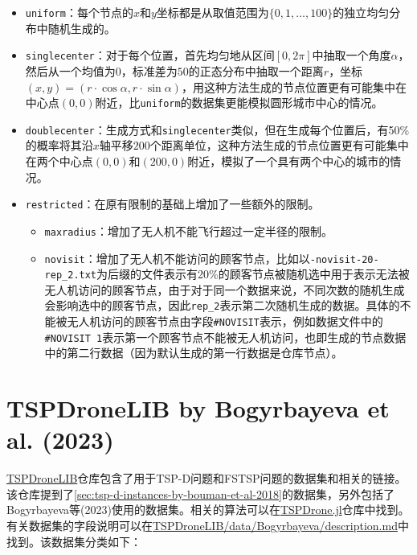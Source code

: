 \begin{itemize}
    \item \texttt{uniform}：每个节点的$x$和$y$坐标都是从取值范围为$\{0,1,\dots,100\}$的独立均匀分布中随机生成的。
    \item \texttt{singlecenter}：对于每个位置，首先均匀地从区间$[0,2\pi]$中抽取一个角度$\alpha$，然后从一个均值为$0$，标准差为$50$的正态分布中抽取一个距离$r$，坐标$(x,y)=(r\cdot \cos \alpha,r\cdot \sin\alpha)$，用这种方法生成的节点位置更有可能集中在中心点$(0,0)$附近，比\texttt{uniform}的数据集更能模拟圆形城市中心的情况。
    \item \texttt{doublecenter}：生成方式和\texttt{singlecenter}类似，但在生成每个位置后，有50\%的概率将其沿$x$轴平移$200$个距离单位，这种方法生成的节点位置更有可能集中在两个中心点$(0,0)$和$(200,0)$附近，模拟了一个具有两个中心的城市的情况。
    \item \texttt{restricted}：在原有限制的基础上增加了一些额外的限制。
    \begin{itemize}
        \item \texttt{maxradius}：增加了无人机不能飞行超过一定半径的限制。
        \item \texttt{novisit}：增加了无人机不能访问的顾客节点，比如以\texttt{-novisit-20-rep\_2.txt}为后缀的文件表示有20\%的顾客节点被随机选中用于表示无法被无人机访问的顾客节点，由于对于同一个数据来说，不同次数的随机生成会影响选中的顾客节点，因此\texttt{rep\_2}表示第二次随机生成的数据。具体的不能被无人机访问的顾客节点由字段\texttt{\#NOVISIT}表示，例如数据文件中的\texttt{\#NOVISIT 1}表示第一个顾客节点不能被无人机访问，也即生成的节点数据中的第二行数据（因为默认生成的第一行数据是仓库节点）。
    \end{itemize}
\end{itemize}

\section{TSPDroneLIB by Bogyrbayeva et al. (2023)}
\href{https://github.com/chkwon/TSPDroneLIB}{TSPDroneLIB}仓库包含了用于TSP-D问题和FSTSP问题的数据集和相关的链接。该仓库提到了\ref{sec:tsp-d-instances-by-bouman-et-al-2018}的数据集，另外包括了Bogyrbayeva等(2023)\cite{bogyrbayevaDeepReinforcementLearning2023}使用的数据集。相关的算法可以在\href{https://github.com/chkwon/TSPDrone.jl}{TSPDrone.jl}仓库中找到。有关数据集的字段说明可以在\href{https://github.com/chkwon/TSPDroneLIB/blob/main/data/Bogyrbayeva/description.md}{TSPDroneLIB/data/Bogyrbayeva/description.md}中找到。该数据集分类如下：

